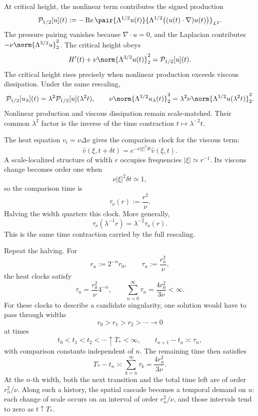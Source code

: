 
At critical height, the nonlinear term contributes the signed production
\[
  \mathcal P_{1/2}[u](t)
  :=
  -\operatorname{Re}
  \pair
    {\Lambda^{1/2}u(t)}
    {\Lambda^{1/2}\bigl((u(t)\cdot\nabla)u(t)\bigr)}_{L^2}.
\]
The pressure pairing vanishes because \(\nabla\cdot u=0\), and the Laplacian contributes \(-\nu\norm{\Lambda^{3/2}u}_2^2\).
The critical height obeys
\[
  H'(t)
  +
  \nu\norm{\Lambda^{3/2}u(t)}_2^2
  =
  \mathcal P_{1/2}[u](t).
\]
The critical height rises precisely when nonlinear production exceeds viscous dissipation.
Under the same rescaling,
\[
  \mathcal P_{1/2}[u_\lambda](t)
  =
  \lambda^2\mathcal P_{1/2}[u](\lambda^2t),
  \qquad
  \nu\norm{\Lambda^{3/2}u_\lambda(t)}_2^2
  =
  \lambda^2\nu\norm{\Lambda^{3/2}u(\lambda^2t)}_2^2.
\]
Nonlinear production and viscous dissipation remain scale-matched.
Their common \(\lambda^2\) factor is the inverse of the time contraction \(t\mapsto\lambda^{-2}t\).


The heat equation \(v_t=\nu\Delta v\) gives the comparison clock for the viscous term:
\[
  \widehat v(\xi,t+\delta t)
  =
  e^{-\nu|\xi|^2\delta t}\widehat v(\xi,t).
\]
A scale-localized structure of width \(r\) occupies frequencies \(|\xi|\simeq r^{-1}\).
Its viscous change becomes order one when
\[
  \nu|\xi|^2\delta t\simeq1,
\]
so the comparison time is
\[
  \tau_\nu(r)
  :=
  \frac{r^2}{\nu}.
\]
Halving the width quarters this clock.
More generally,
\[
  \tau_\nu(\lambda^{-1}r)
  =
  \lambda^{-2}\tau_\nu(r).
\]
This is the same time contraction carried by the full \NavierStokes{} rescaling.


Repeat the halving.
For
\[
  r_n:=2^{-n}r_0,
  \qquad
  \tau_n:=\frac{r_n^2}{\nu},
\]
the heat clocks satisfy
\[
  \tau_n
  =
  \frac{r_0^2}{\nu}4^{-n},
  \qquad
  \sum_{n=0}^{\infty}\tau_n
  =
  \frac{4r_0^2}{3\nu}
  <
  \infty.
\]
For these clocks to describe a candidate singularity, one \NavierStokes{} solution would have to pass through widths
\[
  r_0>r_1>r_2>\cdots\longrightarrow0
\]
at times
\[
  t_0<t_1<t_2<\cdots\uparrow T_*<\infty,
  \qquad
  t_{n+1}-t_n\asymp\tau_n,
\]
with comparison constants independent of \(n\).
The remaining time then satisfies
\[
  T_*-t_n
  \asymp
  \sum_{k=n}^{\infty}\tau_k
  =
  \frac{4r_n^2}{3\nu}.
\]
At the \(n\)-th width, both the next transition and the total time left are of order \(r_n^2/\nu\).
Along such a history, the spatial cascade becomes a temporal demand on \(u\): each change of scale occurs on an interval of order \(r_n^2/\nu\), and those intervals tend to zero as \(t\uparrow T_*\).
